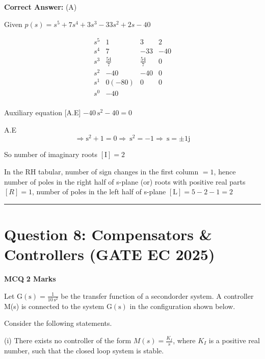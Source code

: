 \documentclass[11pt,a4paper]{article}
\begin{document}
\noindent \textbf{Correct Answer:} (A)

\begin{tcolorbox}[solbox, title=Detailed Solution -- Question 7]
Given $p(s)=s^{5}+7 s^{4}+3 s^{3}-33 s^{2}+2 s-40$

\[
\begin{array}{l|lrl}
s^{5} & 1 & 3 & 2 \\
s^{4} & 7 & -33 & -40 \\
s^{3} & \frac{54}{7} & \frac{54}{7} & 0 \\
s^{2} & -40 & -40 & 0 \\
s^{1} & 0(-80) & 0 & 0 \\
s^{0} & -40 &  &  \\
\end{array}
\]

Auxiliary equation [A.E] $-40 \mathrm{~s}^{2}-40=0$

A.E 
\[
\Rightarrow \mathrm{s}^{2}+1=0 \Rightarrow \mathrm{~s}^{2}=-1 \Rightarrow \mathrm{~s}= \pm 1 \mathrm{j}
\]

So number of imaginary roots $[\mathrm{I}]=2$

In the RH tabular, number of sign changes in the first column $=1$, hence number of poles in the right half of s-plane (or) roots with positive real parts $[R]=1$, number of poles in the left half of s-plane $[\mathrm{L}]=5-2-1=2$
\end{tcolorbox}

\vspace{1.5em}
\hrule
\vspace{1.5em}

\section*{Question 8: Compensators \& Controllers (GATE EC 2025)}
\noindent \textbf{\color{primary}MCQ} \hfill \textbf{\color{secondary}2 Marks}


\noindent Let $\mathrm{G}(\mathrm{s})=\frac{1}{10 \mathrm{~s}^{2}}$ be the transfer function of a secondorder system. A controller M(s) is connected to the system $\mathrm{G}(\mathrm{s})$ in the configuration shown below.

Consider the following statements.

(i) There exists no controller of the form $M(s)=\frac{K_{I}}{s}$, where $K_{I}$ is a positive real number, such that the closed loop system is stable.
\end{document}
